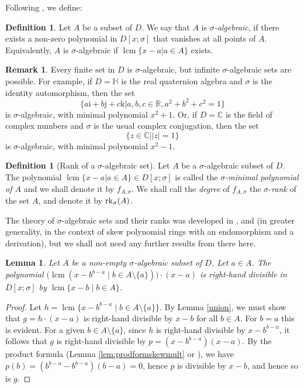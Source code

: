 \documentclass[11pt,reqno]{amsart}
\newtheorem{lem}[thm]{Lemma}
\theoremstyle{definition}
\newtheorem{defn}[thm]{Definition}
\newtheorem{rmk}[thm]{Remark}
\DeclareMathOperator{\lcm}{lcm}
\newcommand{\C}{\mathbb{C}}
\newcommand{\HH}{\mathbb{H}}
\newcommand{\st}{{|}}
\newcommand{\rk}{{\rm rk}}
\newcommand{\fri}{{\mathrm{i}}}
\newcommand{\frj}{{\mathrm{j}}}
\newcommand{\frk}{{\mathrm{k}}}
\begin{document}
Following \cite[\S2]{VL88}, we define:
\begin{defn}
Let $A$ be a subset of $D$. We say that $A$ is \emph{ $\sigma$-algebraic}, if there exists a non-zero polynomial in $D[x;\sigma]$ that vanishes at all points of $A$. Equivalently, $A$ is $\sigma$-algebraic if $\lcm\{x-a \st a \in A\}$ exists. 
\end{defn}
\begin{rmk}
Every finite set in $D$ is $\sigma$-algebraic, but infinite $\sigma$-algebraic sets are possible. For example, if $D = \HH$ is the real quaternion algebra and $\sigma$ is the identity automorphism, then the set $$\{a \fri + b \frj + c \frk \st a,b,c \in \mathbb{R}, a^2+b^2+c^2 = 1\}$$ is $\sigma$-algebraic, with minimal polynomial $x^2+1$. Or, if $D = \C$ is the field of complex numbers and $\sigma$ is the usual complex conjugation, then the set 
$$\{z \in \C \st |z| = 1\}$$
is $\sigma$-algebraic, with minimal polynomial $x^2-1$.
\end{rmk}

\begin{defn}[Rank of a $\sigma$-algebraic set]\label{def:rank} Let $A$ be a $\sigma$-algebraic subset of $D$. The polynomial $\lcm\{x-a \st a \in A\} \in D[x;\sigma]$ is  called the \emph{ $\sigma$-minimal polynomial of $A$} and we shall denote it by $f_{A,\sigma}$. We shall call the \emph{degree} of $f_{A,\sigma}$ the \emph{$\sigma$-rank} of the set $A$, and denote it by $\rk_\sigma(A)$.
\end{defn}

The theory of $\sigma$-algebraic sets and their ranks was developed in \cite{Lam86}, \cite{LL04} and \cite{LaL08} (in greater generality, in the context of skew polynomial rings with an endomorphism and a derivation), but we shall not need any further results from there here. 
\begin{lem}\label{divides} Let $A$ be a non-empty $\sigma$-algebraic subset of $D$. Let $a \in A$. The polynomial $\big(\lcm(x-b^{b-a} \mid b \in A\setminus\{a\})\big)\cdot(x-a)$ is right-hand divisible in $D[x;\sigma]$ by $\lcm\{x-b \mid b \in A\}$. 
\end{lem} 
\begin{proof} Let $h = \lcm\{x-b^{b-a} \mid b \in A \setminus\{a\}\}$. By Lemma \ref{union}, we must show that $g = h\cdot(x-a)$ is right-hand divisible by $x-b$ for all $b \in A$. For $b = a$ this is evident. For a given $b \in A\setminus \{a\}$, since $h$ is right-hand divisible by $x-b^{b-a}$, it follows that $g$ is right-hand divisible by $p = (x-b^{b-a})(x-a)$. By the product formula (Lemma \ref{lem:prodformskewmult} or \cite[Theorem 2.7]{VL88}), we have $p(b) = (b^{b-a}-b^{b-a})(b-a) = 0$, hence $p$ is divisible by $x-b$, and hence so is $g$. \end{proof}
\end{document}
